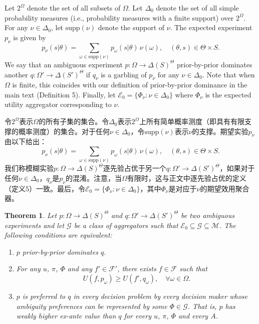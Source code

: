 \documentclass[12pt,a4paper]{article}
\newenvironment{original}
  {\par\vspace{4pt}\noindent\color{black}\ignorespaces}
  {\par\vspace{2pt}}
\newenvironment{translation}
  {\par\vspace{2pt}\noindent\color{myblue}\ignorespaces}
  {\par\vspace{6pt}}
\newtheorem{theorem}{Theorem}[section]
\newcommand{\Delt}{\Delta}
\newcommand{\calF}{\mathcal{F}}
\newcommand{\calM}{\mathcal{M}}
\newcommand{\calE}{\mathcal{E}}
\newcommand{\supp}{\mathrm{supp}}
\begin{document}
\begin{original}
Let $2^{\Omega}$ denote the set of all subsets of $\Omega$. Let $\Delt_0$ denote the set of all simple probability measures (i.e., probability measures with a finite support) over $2^{\Omega}$. For any $\nu\in\Delt_0$, let $\supp(\nu)$ denote the support of $\nu$. The expected experiment $p_{\nu}$ is given by
\begin{equation}
    p_{\nu}(s|\theta) = \sum_{\omega\in\supp(\nu)} p_{\omega}(s|\theta)\,\nu(\omega), \quad (\theta,s)\in\Theta\times S.
\end{equation}
We say that an ambiguous experiment $p:\Omega\to\Delt(S)^{\Theta}$ prior-by-prior dominates another $q:\Omega'\to\Delt(S')^{\Theta}$ if $q_{\nu}$ is a garbling of $p_{\nu}$ for any $\nu\in\Delt_0$. Note that when $\Omega$ is finite, this coincides with our definition of prior-by-prior dominance in the main text (Definition 5). Finally, let $\calE_0=\{\Phi_{\nu}:\nu\in\Delt_0\}$ where $\Phi_{\nu}$ is the expected utility aggregator corresponding to $\nu$.
\end{original}

\begin{translation}
令$2^{\Omega}$表示$\Omega$的所有子集的集合。令$\Delt_0$表示$2^{\Omega}$上所有简单概率测度（即具有有限支撑的概率测度）的集合。对于任何$\nu\in\Delt_0$，令$\supp(\nu)$表示$\nu$的支撑。期望实验$p_{\nu}$由以下给出：
\begin{equation}
    p_{\nu}(s|\theta) = \sum_{\omega\in\supp(\nu)} p_{\omega}(s|\theta)\,\nu(\omega), \quad (\theta,s)\in\Theta\times S.
\end{equation}
我们称模糊实验$p:\Omega\to\Delt(S)^{\Theta}$逐先验占优于另一个$q:\Omega'\to\Delt(S')^{\Theta}$，如果对于任何$\nu\in\Delt_0$，$q_{\nu}$是$p_{\nu}$的混淆。注意，当$\Omega$有限时，这与正文中逐先验占优的定义（定义5）一致。最后，令$\calE_0=\{\Phi_{\nu}:\nu\in\Delt_0\}$，其中$\Phi_{\nu}$是对应于$\nu$的期望效用聚合器。
\end{translation}

\begin{theorem}
Let $p:\Omega\to\Delt(S)^{\Theta}$ and $q:\Omega'\to\Delt(S')^{\Theta}$ be two ambiguous experiments and let $\mathcal{G}$ be a class of aggregators such that $\calE_0\subseteq\mathcal{G}\subseteq\calM$. The following conditions are equivalent:
\begin{enumerate}
    \item $p$ prior-by-prior dominates $q$.
    \item For any $u$, $\pi$, $\Phi$ and any $f'\in\calF'$, there exists $f\in\calF$ such that
    \begin{equation}
        U(f,p_{\omega})\geq U(f',q_{\omega}),\quad\forall\omega\in\Omega.
    \end{equation}
    \item $p$ is preferred to $q$ in every decision problem by every decision maker whose ambiguity preferences can be represented by some $\Phi\in\mathcal{G}$. That is, $p$ has weakly higher ex-ante value than $q$ for every $u$, $\pi$, $\Phi$ and every $A$.
\end{enumerate}
\end{theorem}
\end{document}
